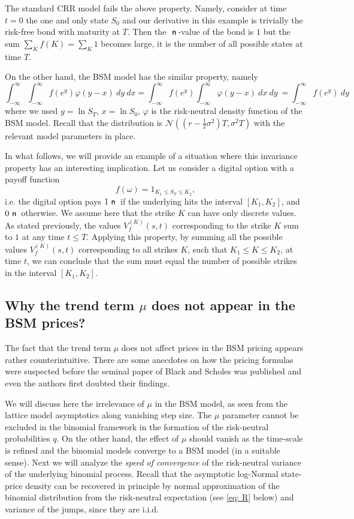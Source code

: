 \documentclass{amsart}
\theoremstyle{definition}
\theoremstyle{remark}
\newcommand{\n}{\!\!\ \nn \!\!\ }
\def\nn{\mathrel{%
    \mathchoice{\n}{\n}{\scriptsize\n}{\tiny\n}%
}}
\def\n {{%
    \setbox0\hbox{ \textsf{n}\!\  }%
    \rlap{\hbox to \wd0{\hss \!\ --\hss}}\box0
}}
\numberwithin{equation}{section}
\newcommand{\1}{\boldsymbol{1}}
\begin{document}
The standard CRR model fails the above property. Namely, consider at time $t=0$ the one and only state $S_0$ and our 
derivative in this example is trivially the risk-free bond with maturity at $T$. Then the $\n$-value of the bond is $1$ but the sum $\sum_K f(K) = \sum_K 1$ becomes large, it is the number of all possible states at time $T$. 

On the other hand, the BSM model has the similar property, namely
\[\int_{-\infty}^\infty  \int_{-\infty}^\infty f(e^y) \varphi(y-x)\ dy\ dx =  \int_{-\infty}^\infty f(e^y) 
\int_{-\infty}^\infty  \varphi(y-x)\ dx\ dy\ =\int_{-\infty}^\infty f(e^y)\ dy\]
where we used $y=\ln S_T$, $x=\ln S_0$, $\varphi$ is the risk-neutral density function of the BSM model.
Recall that the distribution is $\mathcal{N}((r- \frac{1}{2}\sigma^2)T, \sigma^2 T)$ with the relevant model parameters in place. 


In what follows, we will provide an example of a situation where this invariance property has an interesting implication.  Let us consider a digital option with a payoff function
\[
f(\omega)=1_{K_1\leq S_T \leq K_2},
\]
i.e. the digital option pays $1 \n$  if the underlying hits the interval $[K_1,K_2]$, and $0\n$ otherwise. We assume here that the strike $K$ can have only discrete values.
As stated previously, the values $V_f^{(K)}(s,t)$ corresponding to the strike $K$ sum to $1$ at any time $t\leq T$. Applying this property, by summing all the possible values $V_f^{(K)}(s,t)$ corresponding to all strikes $K$, such that $K_1\leq K\leq K_2$, at time $t$, we can conclude that the sum must equal the number of possible strikes in the interval $[K_1,K_2]$.
%




\renewcommand{\t}{\ \!\! \vartriangle\! (t)\ \!\! } 
\subsection{Why the trend term $\mu$ does not appear in the BSM prices?}
The fact that the trend term $\mu$ does not affect prices in the BSM pricing appears rather counterintuitive.
There are some anecdotes on how the pricing formulas were suspected before the seminal paper of Black and Scholes was published and even the authors first doubted their findings. 

We will discuss here the irrelevance of $\mu$ in the BSM model, as seen from the lattice model asymptotics along vanishing step size. 
The $\mu$ parameter cannot be excluded in the binomial framework in the formation of the risk-neutral probabilities $q$. 
On the other hand, the effect of $\mu$ should vanish as the time-scale is refined and the binomial models converge to a BSM model (in a suitable sense). Next we will analyze the \emph{speed of convergence} of the risk-neutral variance of the underlying binomial process. Recall that the asymptotic log-Normal state-price density
can be recovered in principle by normal approximation of the binomial distribution  
from the risk-neutral expectation (see \eqref{eq: R} below) and variance of the jumps, since they are i.i.d.
\end{document}
